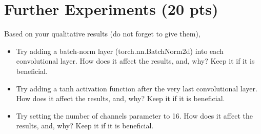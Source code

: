 \documentclass[12pt]{article}
\begin{document}
\section{Further Experiments (20 pts)}
    Based on your qualitative results (do not forget to give them),
    \begin{itemize}
        \item Try adding a batch-norm layer (torch.nn.BatchNorm2d) into each convolutional layer. How does it affect the results, and, why? Keep it if it is beneficial. 
        \item Try adding a tanh activation function after the very last convolutional layer. How does it affect the results, and, why? Keep it if it is beneficial. 
        
        \item Try setting the number of channels parameter to 16. How does it affect the results, and, why? Keep it if it is beneficial. 
        
      
    \end{itemize}

    \vspace*{0.5cm}
\end{document}
